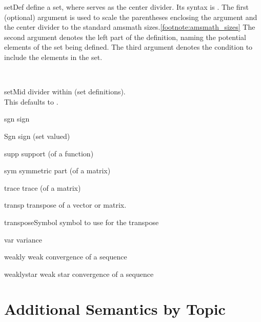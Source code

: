\documentclass[english,a4paper,DIV=12,parskip=full,oneside]{scrartcl}
\begin{document}
\begin{commandlist}
      \item[setDef] define a set, where \codeCommand{\setMid} serves as the center divider.
            Its syntax is .
            The first (optional) argument is used to scale the parentheses enclosing the argument and the center divider to the standard amsmath sizes.\cref{footnote:amsmath_sizes}
            The second argument denotes the left part of the definition, naming the potential elements of the set being defined.
            The third argument denotes the condition to include the elements in the set.
            \par{}\\
            \par{}
        \item[setMid] divider within \codeCommand{\setDef} (set definitions).
            \\This defaults to \mathCodeExample{\setMid}.
        \item[sgn] sign \mathCodeExample{\sgn}
        \item[Sgn] sign (set valued) \mathCodeExample{\Sgn}
        \item[supp] support (of a function)  %
        \item[sym] symmetric part (of a matrix)  %
        \item[trace] trace (of a matrix)   %
        \item[transp] transpose of a vector or matrix.
            \par{}
        \item[transposeSymbol] symbol to use for the transpose
            \par\mathCodeExample{\transposeSymbol}
        \item[var] variance \mathCodeExample{\var}
        \item[weakly] weak convergence of a sequence \mathCodeExample{\weakly}
        \item[weaklystar] weak star convergence of a sequence \mathCodeExample{\weaklystar}
    \end{commandlist}

    \section{Additional Semantics by Topic}\label{sec:semantics-by-topic}
\end{document}
